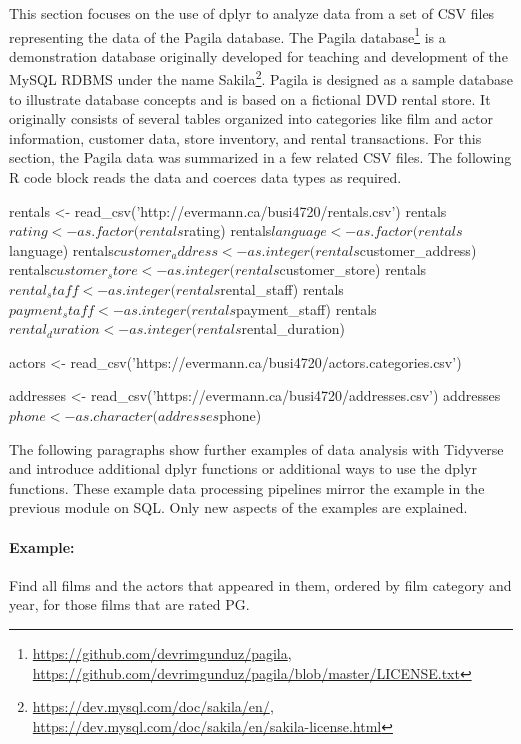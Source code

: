 This section focuses on the use of dplyr to analyze data from a set of CSV files representing the data of the Pagila database. The Pagila database\footnote{\url{https://github.com/devrimgunduz/pagila}, \\
\url{https://github.com/devrimgunduz/pagila/blob/master/LICENSE.txt}} is a demonstration database originally developed for teaching and development of the MySQL RDBMS under the name Sakila\footnote{\url{https://dev.mysql.com/doc/sakila/en/}, \\
\url{https://dev.mysql.com/doc/sakila/en/sakila-license.html}}. Pagila is designed as a sample database to illustrate database concepts and is based on a fictional DVD rental store. It originally consists of several tables organized into categories like film and actor information, customer data, store inventory, and rental transactions. For this section, the Pagila data was summarized in a few related CSV files. The following R code block reads the data and coerces data types as required.

\begin{samepage}
\begin{Rcode}
rentals <- read_csv('http://evermann.ca/busi4720/rentals.csv')
rentals$rating <- as.factor(rentals$rating)
rentals$language <- as.factor(rentals$language)
rentals$customer_address <- as.integer(rentals$customer_address)
rentals$customer_store <- as.integer(rentals$customer_store)
rentals$rental_staff <- as.integer(rentals$rental_staff)
rentals$payment_staff <- as.integer(rentals$payment_staff)
rentals$rental_duration <- as.integer(rentals$rental_duration)

actors <- 
  read_csv('https://evermann.ca/busi4720/actors.categories.csv')
  
addresses <- read_csv('https://evermann.ca/busi4720/addresses.csv')
addresses$phone <- as.character(addresses$phone)
\end{Rcode}
\end{samepage}

The following paragraphs show further examples of data analysis with Tidyverse and introduce additional dplyr functions or additional ways to use the dplyr functions. These example data processing pipelines mirror the example in the previous module on SQL. Only new aspects of the examples are explained.

\paragraph*{Example:} Find all films and the actors that appeared in them, ordered by film category and year, for those films that are rated PG.

